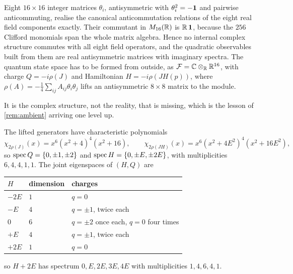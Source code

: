 \begin{theorem}
\label{thm:module}
Eight $16\times16$ integer matrices $\theta_i$, antisymmetric with $\theta_i^2=-\mathbf 1$ and pairwise anticommuting, realise the canonical
anticommutation relations of the eight real field components exactly. Their commutant in $M_{16}(\mathbb{R})$ is $\mathbb{R}\,\mathbf 1$, because the $256$
Clifford monomials span the whole matrix algebra. Hence no internal complex structure commutes with all eight field operators, and the
quadratic observables built from them are real antisymmetric matrices with imaginary spectra. The quantum state space has to be formed
from outside, as $\mathcal F=\mathbb{C}\otimes_{\mathbb{R}}\mathbb{R}^{16}$, with charge $Q=-i\rho(J)$ and Hamiltonian $H=-i\rho(JH(p))$, where
$\rho(A)=-\tfrac14\sum_{ij}A_{ij}\theta_i\theta_j$ lifts an antisymmetric $8\times8$ matrix to the module.
\end{theorem}

It is the complex structure, not the reality, that is missing, which is the lesson of \cref{rem:ambient} arriving one level up.

\begin{theorem}
\label{thm:spectra}
The lifted generators have characteristic polynomials
\[
\chi_{2\rho(J)}(x)=x^6(x^2+4)^4(x^2+16),\qquad \chi_{2\rho(JH)}(x)=x^6(x^2+4E^2)^4(x^2+16E^2),
\]
so $\operatorname{spec} Q=\{0,\pm1,\pm2\}$ and $\operatorname{spec} H=\{0,\pm E,\pm2E\}$, with multiplicities $6,4,4,1,1$. The joint eigenspaces of $(H,Q)$ are
\begin{center}
\begin{tabular}{@{}lll@{}}
\toprule
$H$ & dimension & charges\\
\midrule
$-2E$ & $1$ & $q=0$\\
$-E$ & $4$ & $q=\pm1$, twice each\\
$0$ & $6$ & $q=\pm2$ once each, $q=0$ four times\\
$+E$ & $4$ & $q=\pm1$, twice each\\
$+2E$ & $1$ & $q=0$\\
\bottomrule
\end{tabular}
\end{center}
so $H+2E$ has spectrum $0,E,2E,3E,4E$ with multiplicities $1,4,6,4,1$.
\end{theorem}

